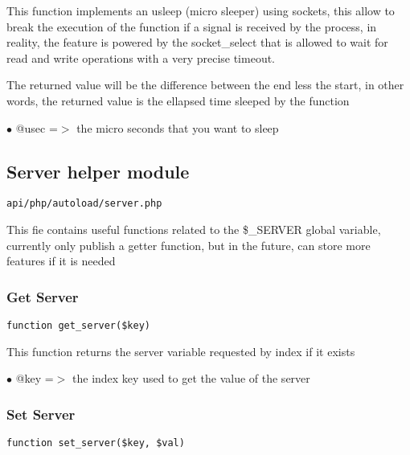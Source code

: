 \documentclass[a4paper]{article}
\begin{document}
This function implements an usleep (micro sleeper) using sockets, this
allow to break the execution of the function if a signal is received by
the process, in reality, the feature is powered by the socket\_select that
is allowed to wait for read and write operations with a very precise
timeout.

The returned value will be the difference between the end less the start,
in other words, the returned value is the ellapsed time sleeped by the
function

\begin{compactitem}
\item[\color{myblue}$\bullet$] @usec =$>$ the micro seconds that you want to sleep
\end{compactitem}

\hypertarget{toc209}{}
\subsection{Server helper module}

\begin{lstlisting}
api/php/autoload/server.php
\end{lstlisting}

This fie contains useful functions related to the \$\_SERVER global variable, currently only publish
a getter function, but in the future, can store more features if it is needed

\hypertarget{toc210}{}
\subsubsection{Get Server}

\begin{lstlisting}
function get_server($key)
\end{lstlisting}

This function returns the server variable requested by index if it exists

\begin{compactitem}
\item[\color{myblue}$\bullet$] @key =$>$ the index key used to get the value of the server
\end{compactitem}

\hypertarget{toc211}{}
\subsubsection{Set Server}

\begin{lstlisting}
function set_server($key, $val)
\end{lstlisting}
\end{document}
